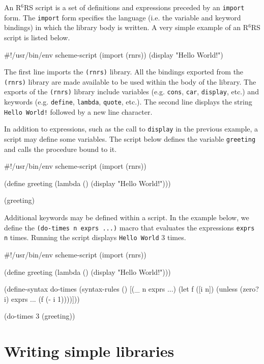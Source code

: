 \documentclass[onecolumn, 12pt, twoside, openright, dvipdfm]{book}
\newcommand{\rnrs}[1]{R$^{\mathrm{#1}}$RS}
\begin{document}
An \rnrs{6} script is a set of definitions and expressions preceded
by an \texttt{import} form.  The \texttt{import} form specifies
the language (i.e. the variable and keyword bindings) in which the
library body is written.  A very simple example of an \rnrs{6}
script is listed below.

\begin{CodeInline}
#!/usr/bin/env scheme-script
(import (rnrs))
(display "Hello World!\n")
\end{CodeInline}

The first line imports the \texttt{(rnrs)} library.  All the
bindings exported from the \texttt{(rnrs)} library are made
available to be used within the body of the library.  
The exports of the \texttt{(rnrs)} library include variables
(e.g. \texttt{cons}, \texttt{car}, \texttt{display}, etc.) and
keywords (e.g.  \texttt{define}, \texttt{lambda}, \texttt{quote},
etc.).  The second line displays the string \texttt{Hello World!}
followed by a new line character.

In addition to expressions, such as the call to \texttt{display} in
the previous example, a script may define some variables.  The
script below defines the variable \texttt{greeting} and calls the
procedure bound to it.

\begin{CodeInline}
#!/usr/bin/env scheme-script
(import (rnrs))

(define greeting
  (lambda ()
    (display "Hello World!\n")))

(greeting)
\end{CodeInline}

Additional keywords may be defined within a script.  In the example
below, we define the \texttt{(do-times n exprs ...)} macro that
evaluates the expressions \texttt{exprs} \texttt{n} times.  Running
the script displays \texttt{Hello World} 3 times.
\newpage

\begin{CodeInline}
#!/usr/bin/env scheme-script
(import (rnrs))

(define greeting
  (lambda ()
    (display "Hello World!\n")))

(define-syntax do-times
  (syntax-rules ()
    [(_ n exprs ...)
     (let f ([i n])
       (unless (zero? i)
         exprs ...
         (f (- i 1))))]))

(do-times 3 (greeting))
\end{CodeInline}


\section{Writing simple libraries}
\end{document}
